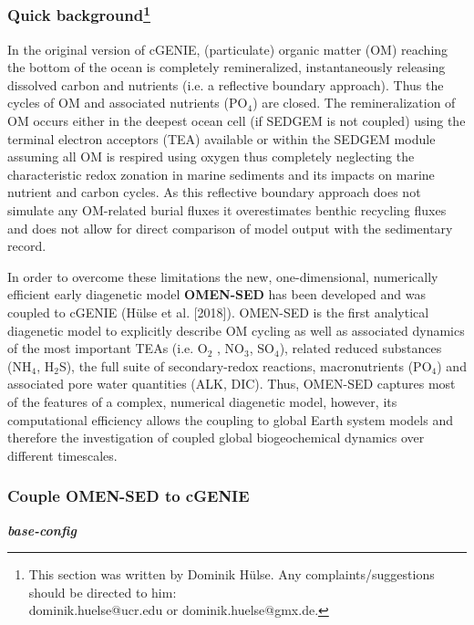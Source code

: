\documentclass[11pt,fleqn]{book} %
\begin{document}
%
\subsubsection*{Quick background\footnote{This section was written by Dominik H\"ulse. Any complaints/suggestions should be directed to him:\\ dominik.huelse@ucr.edu or dominik.huelse@gmx.de.}}

In the original version of cGENIE, (particulate) organic matter (OM) reaching the bottom of the ocean is completely remineralized, instantaneously releasing dissolved carbon and nutrients (i.e. a reflective boundary approach).
Thus the cycles of OM and associated nutrients (PO$_4$) are closed. The remineralization of OM occurs either in the deepest ocean cell (if SEDGEM is not coupled) using the terminal electron acceptors (TEA) available or within the SEDGEM
module assuming all OM is respired using oxygen thus completely neglecting the characteristic redox zonation in marine sediments and its impacts on marine nutrient and carbon cycles.
As this reflective boundary approach does not simulate any OM-related burial fluxes it overestimates benthic recycling fluxes and does not allow for direct comparison of model output with the sedimentary record.

In order to overcome these limitations the new, one-dimensional, numerically efficient early diagenetic model \textbf{OMEN-SED} has been developed and was coupled to cGENIE (H\"ulse et al. [2018]).
OMEN-SED is the first analytical diagenetic model to explicitly describe OM cycling as well as associated dynamics of the most important TEAs (i.e. O$_2$ , NO$_3$, SO$_4$), related reduced substances (NH$_4$, H$_2$S), the full suite of
secondary-redox reactions, macronutrients (PO$_4$) and associated pore water quantities (ALK, DIC). Thus, OMEN-SED captures most of the features of a complex, numerical diagenetic model, however, its computational efficiency allows the
coupling to global Earth system models and therefore the investigation of coupled global biogeochemical dynamics over different timescales.

%
\subsubsection*{Couple OMEN-SED to cGENIE}

\textbf{\textit{base-config}}
\vspace{1mm}
\end{document}
